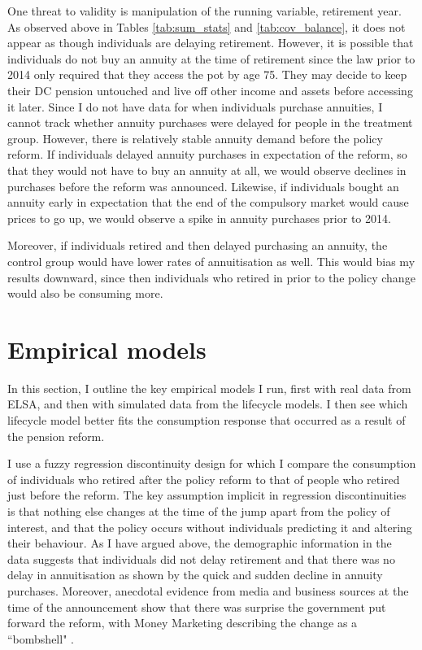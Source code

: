 \documentclass[12pt]{article}
\begin{document}
One threat to validity is manipulation of the running variable, retirement year.
As observed above in Tables \ref{tab:sum_stats} and \ref{tab:cov_balance}, it
does not appear as though individuals are delaying retirement. However, it is
possible that individuals do not buy an annuity at the time of retirement since
the law prior to 2014 only required that they access the pot by age 75. They may
decide to keep their DC pension untouched and live off other income and assets
before accessing it later. Since I do not have data for when individuals
purchase annuities, I cannot track whether annuity purchases were delayed for
people in the treatment group. However, there is relatively stable annuity
demand before the policy
reform. If individuals delayed annuity purchases in expectation of the reform,
so that they would not have to buy an annuity at all, we would observe declines
in purchases before the reform was announced. Likewise, if individuals bought an
annuity early in expectation that the end of the compulsory market would cause
prices to go up, we would observe a spike in annuity purchases prior to 2014.

Moreover, if individuals retired and then delayed purchasing an annuity, the
control group would have lower rates of annuitisation as well. This would bias
my results downward, since then individuals who retired in prior to the policy
change would also be consuming more.


\section{Empirical models}

In this section, I outline the key empirical models I run, first with real
data from ELSA, and then with simulated data from the lifecycle models. I then
see which lifecycle model better fits the consumption response that occurred as
a result of the pension reform.

I use a fuzzy regression discontinuity design for which I compare the
consumption of individuals who retired after the policy reform to that of people
who retired just before the reform. The key assumption implicit in regression
discontinuities is that nothing else changes at the time of the jump apart from
the policy of interest, and that the policy occurs without individuals
predicting it and altering their behaviour. As I have argued above, the
demographic information in the data suggests that individuals did not delay
retirement and that there was no delay in annuitisation as shown by the quick
and sudden decline in annuity purchases. Moreover, anecdotal evidence from media
and business sources at the time of the announcement show that there was
surprise the government put forward the reform, with Money Marketing describing
the change as a ``bombshell" \citep{money_marketing_announcement}.
\end{document}
